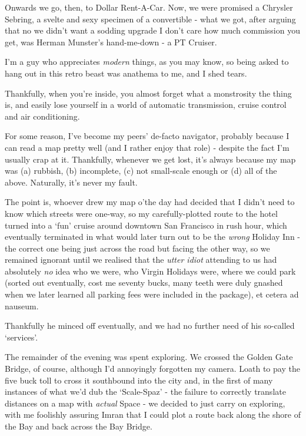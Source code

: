 \documentclass[b5paper,11pt,titlepage,draft]{book}
\begin{document}
Onwards we go, then, to Dollar Rent-A-Car.  Now, we were promised a Chrysler Sebring, a svelte and sexy specimen of a convertible - what we got, after arguing that no we didn't want a sodding upgrade I don't care how much commission you get, was Herman Munster's hand-me-down - a PT Cruiser.

I'm a guy who appreciates \emph{modern} things, as you may know, so being asked to hang out in this retro beast was anathema to me, and I shed tears.

Thankfully, when you're inside, you almost forget what a monstrosity the thing is, and easily lose yourself in a world of automatic transmission, cruise control and air conditioning.

For some reason, I've become my peers' de-facto navigator, probably because I can read a map pretty well (and I rather enjoy that role) - despite the fact I'm usually crap at it.  Thankfully, whenever we get lost, it's always because my map was (a) rubbish, (b) incomplete, (c) not small-scale enough or (d) all of the above.  Naturally, it's never my fault.

The point is, whoever drew my map o'the day had decided that I didn't need to know which streets were one-way, so my carefully-plotted route to the hotel turned into a `fun' cruise around downtown San Francisco in rush hour, which eventually terminated in what would later turn out to be the \emph{wrong} Holiday Inn - the correct one being just across the road but facing the other way, so we remained ignorant until we realised that the \emph{utter idiot} attending to us had absolutely \emph{no} idea who we were, who Virgin Holidays were, where we could park (sorted out eventually, cost me seventy bucks, many teeth were duly gnashed when we later learned all parking fees were included in the package), et cetera ad nauseum.

Thankfully he minced off eventually, and we had no further need of his so-called `services'.

The remainder of the evening was spent exploring.  We crossed the Golden Gate Bridge, of course, although I'd annoyingly forgotten my camera.  Loath to pay the five buck toll to cross it southbound into the city and, in the first of many instances of what we'd dub the `Scale-Spaz' - the failure to correctly translate distances on a map with \emph{actual} Space - we decided to just carry on exploring, with me foolishly assuring Imran that I could plot a route back along the shore of the Bay and back across the Bay Bridge.
\end{document}
